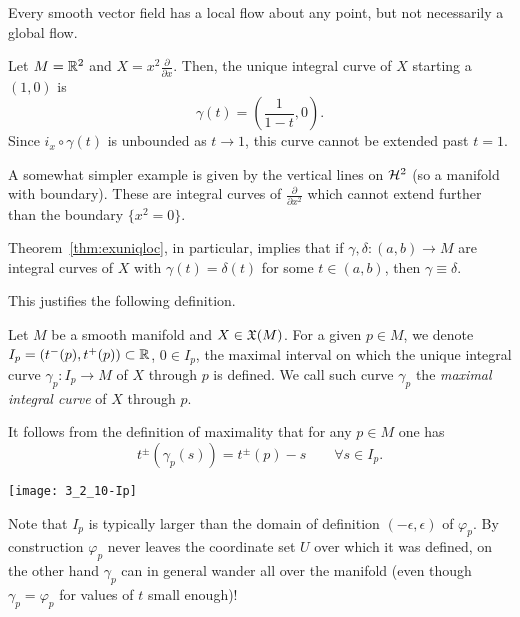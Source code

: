 Every smooth vector field has a local flow about any point, but not necessarily a global flow.
\begin{example}\label{ex:non-complete}
  Let $M = \mathbb{R}^2$ and $X = x^2 \frac{\partial}{\partial x}$.
  Then, the unique integral curve of $X$ starting a $(1,0)$ is
  \begin{equation}
    \gamma(t) = \left(\frac{1}{1-t}, 0\right).
  \end{equation}
  Since $i_x \circ \gamma(t)$ is unbounded as $t\to 1$, this curve cannot be extended past $t=1$.

  A somewhat simpler example is given by the vertical lines on $\mathcal{H}^2$ (so a manifold with boundary). These are integral curves of $\frac{\partial}{\partial x^2}$ which cannot extend further than the boundary $\{x^2=0\}$.
\end{example}

Theorem~\ref{thm:exuniqloc}, in particular, implies that if $\gamma, \delta : (a,b)\to M$ are integral curves of $X$ with $\gamma(t) = \delta(t)$ for some $t \in(a,b)$, then $\gamma\equiv\delta$.

This justifies the following definition.
\begin{definition}
  Let $M$ be a smooth manifold and $X\in\mathfrak{X}(M)$.
  For a given $p\in M$, we denote $I_p = \left(t^-(p), t^+(p)\right) \subset\mathbb{R}$, $0 \in I_p$, the maximal interval on which the unique integral curve $\gamma_p : I_p \to M$ of $X$ through $p$ is defined.
  We call such curve $\gamma_p$ the \emph{maximal integral curve} of $X$ through $p$.
\end{definition}

\begin{remark}
  It follows from the definition of maximality that for any $p\in M$ one has
  \begin{equation}
    t^{\pm}(\gamma_p(s)) = t^\pm(p) - s \qquad \forall s\in I_p.
  \end{equation}
\end{remark}

\begin{marginfigure}
  \texttt{[image: 3\_2\_10-Ip]}
\end{marginfigure}
Note that $I_p$ is typically larger than the domain of definition $(-\epsilon, \epsilon)$ of $\varphi_p$.
By construction $\varphi_p$ never leaves the coordinate set $U$ over which it was defined, on the other hand $\gamma_p$ can in general wander all over the manifold (even though $\gamma_p = \varphi_p$ for values of $t$ small enough)!

